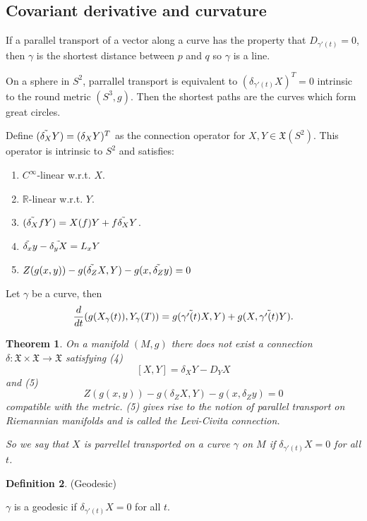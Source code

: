 \documentclass{article}
\newtheorem{theorem}{Theorem}[section]
\theoremstyle{definition}
\newtheorem{defn}[theorem]{Definition}
\newenvironment{definition}
  {\vspace{8pt}\begin{mdframed}[backgroundcolor=blueish,innertopmargin=4]\begin{defn}}
  {\end{defn}\end{mdframed}\vspace{4pt}}
\begin{document}
\subsection{Covariant derivative and curvature}

If a parallel transport of a vector along a curve has the property that $D_{\gamma'(t)} = 0$, then $\gamma$ is the shortest distance between $p$ and $q$ so $\gamma$ is a line.

On a sphere in $S^2$, parrallel transport is equivalent to $(\delta _{\gamma'(t)} X )^T = 0$ intrinsic to the round metric $(S^3, g)$. Then the shortest paths are the curves which form great circles.



Define $(\Tilde{\delta _{X}} Y)= (\delta_X Y)^T $ as the connection operator for $X,Y\in \mathfrak{X}(S^2)$. This operator is intrinsic to $S^2$ and satisfies:
\begin{enumerate}
    \item $C^\infty$-linear  w.r.t. $X$.
    \item $\mathbb R$-linear  w.r.t. $Y$.
    \item $(\Tilde{\delta _{X}} fY) = X(f)Y + f\Tilde{\delta_X}Y$.
    \item $\Tilde{\delta_x}y - \Tilde{\delta_y X} = L_x Y$
    \item $Z(g(x,y)) - g(\Tilde{\delta_Z} X,Y) - g(x, \Tilde{\delta_Z}y) = 0$
    
\end{enumerate}

Let $\gamma$ be a curve, then 
\[
\frac{d}{dt} (g(X_\gamma(t)), Y_\gamma (T)) = g(\Tilde{\gamma'(t)}X, Y ) + g(X, \Tilde{\gamma'(t)} Y). 
\]

\begin{theorem}
On a manifold $(M, g)$ there does not exist a connection $\delta : \mathfrak X \times  \mathfrak X \rightarrow \mathfrak X$ satisfying (4)
\[
[X, Y] = \delta_X Y - D_Y X
\]
and (5)
\[
Z(g(x,y)) - g(\delta_Z X,Y) - g(x, \delta_Z y) = 0
\]
compatible with the metric. (5) gives rise to the notion of parallel transport on Riemannian manifolds and is called the Levi-Civita connection.

So we say that $X$ is parrellel transported on a curve $\gamma$ on $M$ if $\delta_{\gamma'(t)} X = 0$ for all $t$.

\end{theorem}


\begin{definition} (Geodesic)
 
$\gamma$ is a geodesic if  $\delta_{\gamma'(t)} X = 0$ for all $t$.

\end{definition}
\end{document}
